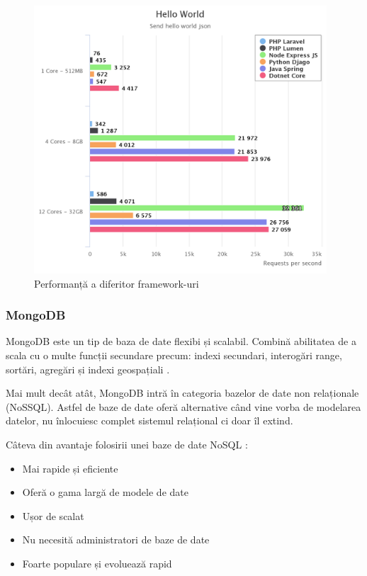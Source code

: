 \documentclass[12pt]{article}
\begin{document}
\begin{figure}[H]
\centering
\includegraphics[height=10cm]{nodespeed.png}
\caption{Performanță a diferitor framework-uri \cite{reqpersec}}
\end{figure}

\newpage
\subsubsection{MongoDB}

MongoDB este un tip de baza de date flexibi și scalabil. Combină abilitatea
de a scala cu o multe funcții secundare precum: indexi secundari, interogări range,
sortări, agregări și indexi geospațiali \cite{banker2011mongodb}.

Mai mult decât atât, MongoDB intră în categoria bazelor de date non 
relaționale (NoSSQL). Astfel de baze de date oferă alternative când vine vorba
de modelarea datelor, nu înlocuiesc complet sistemul relațional ci doar îl extind.

Câteva din avantaje folosirii unei baze de date NoSQL \cite{nayak2013type}:
\begin{itemize}
    \item Mai rapide și eficiente
    \item Oferă o gama largă de modele de date
    \item Ușor de scalat
    \item Nu necesită administratori de baze de date
    \item Foarte populare și evoluează rapid
\end{itemize}
\end{document}
